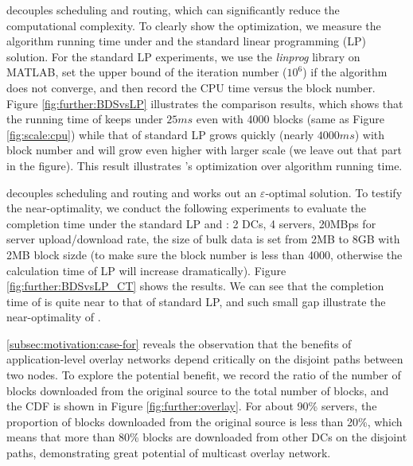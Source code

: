 \label{subsubsec:evaluation:depth}

 \name decouples scheduling and routing, which can significantly reduce the computational complexity. To clearly show the optimization, we measure the algorithm running time under \name and the standard linear programming (LP) solution. For the standard LP experiments, we use the \textit{linprog} library on MATLAB, set the upper bound of the iteration number ($10^6$) if the algorithm does not converge, and then record the CPU time versus the block number. Figure \ref{fig:further:BDSvsLP} illustrates the comparison results, which shows that the running time of \name keeps under $25ms$ even with 4000 blocks (same as Figure \ref{fig:scale:cpu}) while that of standard LP grows quickly (nearly $4000ms$) with block number and will grow even higher with larger scale (we leave out that part in the figure). This result illustrates \name's optimization over algorithm running time.

 \name decouples scheduling and routing and works out an $\varepsilon$-optimal solution. To testify the near-optimality, we conduct the following experiments to evaluate the completion time under the standard LP and \name: 2 DCs, 4 servers, 20MBps for server upload/download rate, the size of bulk data is set from 2MB to 8GB with 2MB block sizde (to make sure the block number is less than 4000, otherwise the calculation time of LP will increase dramatically). Figure \ref{fig:further:BDSvsLP_CT} shows the results. We can see that the completion time of \name is quite near to that of standard LP, and such small gap illustrate the near-optimality of \name.


 \Section\ref{subsec:motivation:case-for} reveals the observation that the benefits of application-level overlay networks depend critically on the disjoint paths between two nodes. To explore the potential benefit, we record the ratio of the number of blocks downloaded from the original source to the total number of blocks, and the CDF is shown in Figure \ref{fig:further:overlay}. For about 90\% servers, the proportion of blocks downloaded from the original source is less than 20\%, which means that more than 80\% blocks are downloaded from other DCs on the disjoint paths, demonstrating great potential of multicast overlay network.



